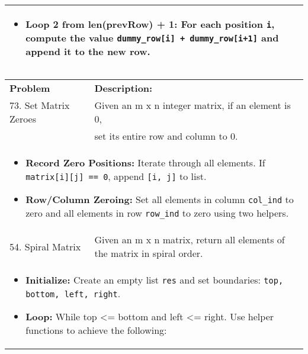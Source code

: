 \begin{summary}
\begin{center}
\begin{tabular}{ll}
{\begin{itemize}
\begin{itemize}
                        \item \textbf{Loop 2 from len(prevRow) + 1:} For each position \texttt{i}, compute the value \texttt{dummy\_row[i] + dummy\_row[i+1]} and append it to the new row. 
                    \end{itemize}
                \end{itemize}                
            } \\
            \bottomrule
        \end{tabular}
    \end{center}
\end{summary}
\newpage

\begin{summary}
    \begin{center}
        \begin{tabular}{ll}
            \toprule
            \textbf{Problem} & \textbf{Description:} \\
            73. Set Matrix Zeroes & Given an m x n integer matrix, if an element is 0, \\
            & set its entire row and column to 0. \\
            \multicolumn{2}{p{\linewidth}}{
                \begin{itemize}                
                    \item \textbf{Record Zero Positions:} Iterate through all elements. If \texttt{matrix[i][j] == 0}, append \texttt{[i, j]} to list.
                    \item \textbf{Row/Column Zeroing:} Set all elements in column \texttt{col\_ind} to zero and all elements in row \texttt{row\_ind} to zero using two helpers.
                \end{itemize}                
            } \\
            \midrule
            54. Spiral Matrix & Given an m x n matrix, return all elements of the matrix in spiral order. \\
            \multicolumn{2}{p{\linewidth}}{
                \begin{itemize}
                    \item \textbf{Initialize:} Create an empty list \texttt{res} and set boundaries: \texttt{top, bottom, left, right}.
                    \item \textbf{Loop:} While top <= bottom and left <= right. Use helper functions to achieve the following:
                    \begin{itemize}

\end{itemize}
\end{itemize}}
\end{tabular}
\end{center}
\end{summary}
